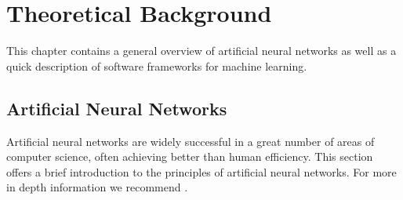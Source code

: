 \chapter{Theoretical Background}
\label{sec:chap2}
This chapter contains a general overview of artificial neural networks as well as a quick description of software frameworks for machine learning.

\section{Artificial Neural Networks}
Artificial neural networks are widely successful in a great number of areas of computer science, often achieving better than human efficiency. This section offers a brief introduction to the principles of artificial neural networks. For more in depth information we recommend \cite{goodfellow_deep_2016}.


